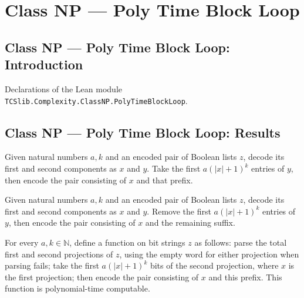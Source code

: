 \section{Class NP --- Poly Time Block Loop}
\subsection*{Class NP --- Poly Time Block Loop: Introduction}

Declarations of the Lean module \texttt{TCSlib.Complexity.ClassNP.PolyTimeBlockLoop}.

\subsection*{Class NP --- Poly Time Block Loop: Results}

\begin{definition}
\label{Complexity.sliceTakeAt}
\leanok
{}
Given natural numbers $a,k$ and an encoded pair of Boolean lists $z$, decode its first
and second components as $x$ and $y$. Take the first $a(|x|+1)^k$ entries of $y$, then
encode the pair consisting of $x$ and that prefix.
\end{definition}

\begin{definition}
\label{Complexity.sliceDropAt}
\leanok
{}
Given natural numbers $a,k$ and an encoded pair of Boolean lists $z$, decode its first
and second components as $x$ and $y$. Remove the first $a(|x|+1)^k$ entries of $y$, then
encode the pair consisting of $x$ and the remaining suffix.
\end{definition}

\begin{theorem}
\label{Complexity.polyTimeComputable_sliceTakeAt}
\leanok
{}
For every $a,k\in\mathbb{N}$, define a function on bit strings $z$ as follows: parse the
total first and second projections of $z$, using the empty word for either projection
when parsing fails; take the first $a(|x|+1)^k$ bits of the second projection, where $x$
is the first projection; then encode the pair consisting of $x$ and this prefix. This
function is polynomial-time computable.
\end{theorem}

